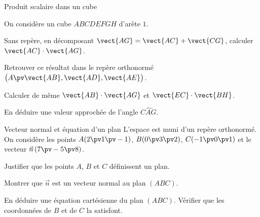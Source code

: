 \begin{exercice}[1]{Produit scalaire dans un cube}
\begin{codecote}[0.6]
On considère un cube $ABCDEFGH$ d'arête $1$.
\begin{questions}
  \item Sans repère, en décomposant $\vect{AG}=\vect{AC}+\vect{CG}$, calculer $\vect{AC}\cdot\vect{AG}$.
  \item Retrouver ce résultat dans le repère orthonormé $\big(A\pv\vect{AB},\vect{AD},\vect{AE}\big)$.
  \item Calculer de même $\vect{AB}\cdot\vect{AG}$ et $\vect{EC}\cdot\vect{BH}$.
  \item En déduire une valeur approchée de l'angle $\widehat{CAG}$.
\end{questions}
\cote
\centering
{}
\end{codecote}
\end{exercice}

\begin{exercice}[1]{Vecteur normal et équation d'un plan}
L'espace est muni d'un repère orthonormé. On considère les points $A(2\pv1\pv-1)$, $B(0\pv3\pv2)$, $C(-1\pv0\pv1)$ et le vecteur
$\vec n\,(7\pv-5\pv8)$.
\begin{questions}
  \item Justifier que les points $A$, $B$ et $C$ définissent un plan.
  \item Montrer que $\vec n$ est un vecteur normal au plan $(ABC)$.
  \item En déduire une équation cartésienne du plan $(ABC)$. Vérifier que les coordonnées de $B$ et de $C$ la satisfont.
\end{questions}
\end{exercice}


